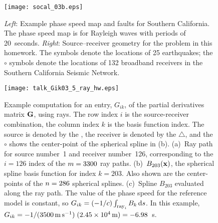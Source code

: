 \documentclass[11pt,titlepage,fleqn]{article}
\begin{document}


\clearpage\pagebreak

\begin{figure}
\hspace{-0.5cm}
\texttt{[image: socal\_03b.eps]}
\caption[Source--receiver geometry for southern California]
{{
{\em Left}: Example phase speed map and faults for Southern California. The phase speed map is for Rayleigh waves with periods of 20~seconds.
{\em Right}: Source--receiver geometry for the problem in this homework. The  symbols denote the locations of 25 earthquakes; the $\circ$ symbols denote the locations of 132 broadband receivers in the Southern California Seismic Network.
\label{fig:geometry}
}}
\end{figure}

\begin{figure}[p]
\hspace{-1.5cm}
\texttt{[image: talk\_Gik03\_5\_ray\_hw.eps]}
\caption[Basis function]
{{
Example computation for an entry, $G_{ik}$, of the partial derivatives matrix $\mbox{${\bf G}$}$, using rays. The row index $i$ is the source-receiver combination, the column index $k$ is the basis function index. The source is denoted by the , the receiver is denoted by the $\triangle$, and the $\circ$ shows the center-point of the spherical spline in (b).
(a)~Ray path for source number~1 and receiver number~126, corresponding to the $i=126$ index of the $m=3300$ ray paths.
(b)~$B_{203}(\mbox{${\bf x}$})$, the spherical spline basis function for index $k=203$. Also shown are the center-points of the $n=286$ spherical splines.
(c)~Spline $B_{203}$ evaluated along the ray path. The value of the phase speed for the reference model is constant, so $G_{ik} = (-1/c) \int_{{\rm ray}_i} B_k\,\mathrm{d} s$. In this example, $G_{ik} = -1/(3500\,{\rm m\,s^{-1}})\;(2.45 \times 10^4\,{\rm m})  = -6.98$~s. 
\label{fig:basis}
}}
\end{figure}

\end{document}
